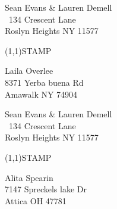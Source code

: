\documentclass[12pt]{article}
\begin{document}
\begin{minipage}{.5\linewidth} \noindent
Sean Evans \& Lauren Demell\\\ 
134 Crescent Lane\\ 
Roslyn Heights NY 11577
\end{minipage}
\begin{minipage}{.5\linewidth \hspace{-.2in} \vspace{-.3in}}
\begin{flushright}
\framebox(1,1){STAMP}
\end{flushright}
\end{minipage}

\begin{center} \begin{Huge} \vspace*{\fill}
Laila Overlee\\
8371 Yerba buena Rd\\
Amawalk NY 74904\\
\vspace{\fill} \end{Huge} \end{center}

\clearpage

\begin{minipage}{.5\linewidth} \noindent
Sean Evans \& Lauren Demell\\\ 
134 Crescent Lane\\ 
Roslyn Heights NY 11577
\end{minipage}
\begin{minipage}{.5\linewidth \hspace{-.2in} \vspace{-.3in}}
\begin{flushright}
\framebox(1,1){STAMP}
\end{flushright}
\end{minipage}

\begin{center} \begin{Huge} \vspace*{\fill}
Alita Spearin\\
7147 Spreckels lake Dr\\
Attica OH 47781\\
\vspace{\fill} \end{Huge} \end{center}

\clearpage
\end{document}
